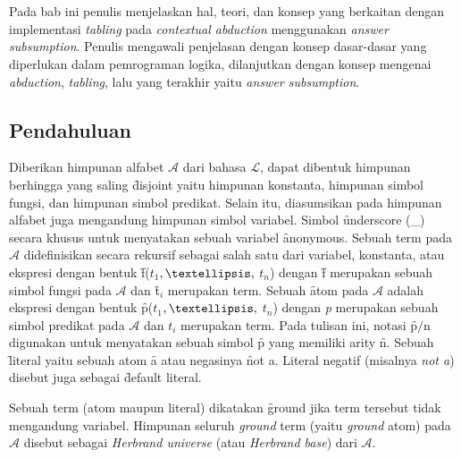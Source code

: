 \chapter{\babDua}
\label{bab2}


\addtocounter{babDuaNum}{2}
Pada bab ini penulis menjelaskan hal, teori, dan konsep yang berkaitan dengan implementasi \textit{tabling} pada \textit{contextual abduction} menggunakan \textit{answer subsumption}. Penulis mengawali penjelasan dengan konsep dasar-dasar yang diperlukan dalam pemrograman logika, dilanjutkan dengan konsep mengenai \textit{abduction}, \textit{tabling}, lalu yang terakhir yaitu \textit{answer subsumption}.
\section{Pendahuluan}
Diberikan himpunan alfabet $\mathcal{A}$ dari bahasa $\mathcal{L}$, dapat dibentuk himpunan berhingga yang saling \f{disjoint} yaitu himpunan konstanta, himpunan simbol fungsi, dan himpunan simbol predikat. Selain itu, diasumsikan pada himpunan alfabet juga mengandung himpunan simbol variabel. Simbol \f{underscore} (\_) secara khusus untuk menyatakan sebuah variabel \f{anonymous}. Sebuah term pada $\mathcal{A}$ didefinisikan secara rekursif sebagai salah satu dari variabel, konstanta, atau ekspresi dengan bentuk \f{f}(\textit{$t_{1}$}$, \textellipsis,$ \textit{$t_{n}$}) dengan \f{f} merupakan sebuah simbol fungsi pada $\mathcal{A}$ dan \f{t$_{i}$} merupakan term. Sebuah \f{atom} pada $\mathcal{A}$ adalah ekspresi dengan bentuk \f{p}(\textit{$t_{1}$}$, \textellipsis,$ \textit{$t_{n}$}) dengan \textit{p} merupakan sebuah simbol predikat pada $\mathcal{A}$ dan \f{$t_{i}$} merupakan term. Pada tulisan ini, notasi \f{p$/$n} digunakan untuk menyatakan sebuah simbol \f{p} yang memiliki arity \f{n}. Sebuah \f{literal} yaitu sebuah atom \f{a} atau negasinya \f{not a}. Literal negatif (misalnya \textit{not a}) disebut juga sebagai \f{default} literal. 

Sebuah term (atom maupun literal) dikatakan \f{ground} jika term tersebut tidak mengandung variabel. Himpunan seluruh \textit{ground} term (yaitu \textit{ground} atom) pada \( \mathcal{A} \) disebut sebagai \textit{Herbrand universe} (atau \textit{Herbrand base}) dari \( \mathcal{A} \).
\\

